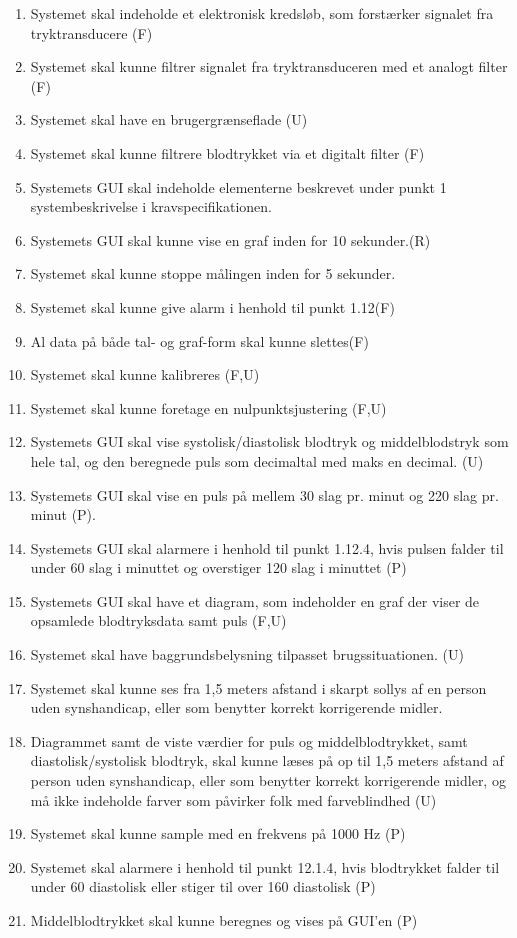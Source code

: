 \begin{enumerate}[4.1]
	\item Systemet skal indeholde et elektronisk kredsløb, som forstærker signalet fra tryktransducere (F)
	\item Systemet skal kunne filtrer signalet fra tryktransduceren med et analogt filter (F)
	\item Systemet skal have en brugergrænseflade (U)
	\item Systemet skal kunne filtrere blodtrykket via et digitalt filter (F)
	\item Systemets GUI skal indeholde elementerne beskrevet under punkt 1 systembeskrivelse i kravspecifikationen.  
	\item Systemets GUI skal kunne vise en graf inden for 10 sekunder.(R)
	\item Systemet skal kunne stoppe målingen inden for 5 sekunder.
	\item Systemet skal kunne give alarm i henhold til punkt 1.12(F)
	\item Al data på både tal- og graf-form skal kunne slettes(F)
	\item Systemet skal kunne kalibreres (F,U)
	\item Systemet skal kunne foretage en nulpunktsjustering (F,U)
	\item Systemets GUI skal vise systolisk/diastolisk blodtryk og middelblodstryk som hele tal, og den beregnede puls som decimaltal med maks en decimal. (U)
	\item Systemets GUI skal vise en puls på mellem 30 slag pr. minut og 220 slag pr. minut (P).
	\item Systemets GUI skal alarmere i henhold til punkt 1.12.4, hvis pulsen falder til under 60 slag i minuttet og overstiger 120 slag i minuttet (P)
	\item Systemets GUI skal have et diagram, som indeholder en graf der viser de opsamlede blodtryksdata samt puls (F,U)
	\item Systemet skal have baggrundsbelysning tilpasset brugssituationen. (U)
	\item Systemet skal kunne ses fra 1,5 meters afstand i skarpt sollys af en person uden synshandicap, eller som benytter korrekt korrigerende midler.
	\item Diagrammet samt de viste værdier for puls og middelblodtrykket, samt diastolisk/systolisk blodtryk, skal kunne læses på op til 1,5 meters afstand af person uden synshandicap, eller som benytter korrekt korrigerende midler, og må ikke indeholde farver som påvirker folk med farveblindhed (U)
	\item Systemet skal kunne sample med en frekvens på 1000 Hz (P)
	\item Systemet skal alarmere i henhold til punkt 12.1.4, hvis blodtrykket falder til under 60 diastolisk eller stiger til over 160 diastolisk (P)
	\item Middelblodtrykket skal kunne beregnes og vises på GUI’en (P)


\end{enumerate}
